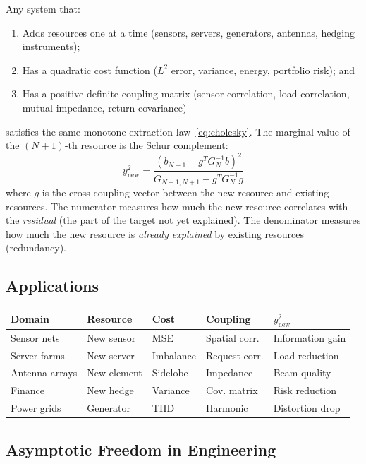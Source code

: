 \documentclass[11pt,a4paper]{article}
\begin{document}
Any system that:
\begin{enumerate}
  \item Adds resources one at a time (sensors, servers, generators,
    antennas, hedging instruments);
  \item Has a quadratic cost function ($L^2$ error, variance, energy,
    portfolio risk); and
  \item Has a positive-definite coupling matrix (sensor correlation,
    load correlation, mutual impedance, return covariance)
\end{enumerate}
satisfies the same monotone extraction law~\eqref{eq:cholesky}.
The marginal value of the $(N+1)$-th resource is the Schur complement:
\begin{equation}\label{eq:schur}
  y_{\text{new}}^2 = \frac{(b_{N+1} - g^T G_N^{-1} b)^2}
    {G_{N+1,N+1} - g^T G_N^{-1} g}
\end{equation}
where $g$ is the cross-coupling vector between the new resource and
existing resources. The numerator measures how much the new resource
correlates with the \emph{residual} (the part of the target not yet
explained). The denominator measures how much the new resource is
\emph{already explained} by existing resources (redundancy).

\subsection{Applications}

\begin{center}
\small
\begin{tabular}{@{}lllll@{}}
\toprule
\textbf{Domain} & \textbf{Resource} & \textbf{Cost} & \textbf{Coupling} & \textbf{$y^2_\text{new}$} \\
\midrule
Sensor nets & New sensor & MSE & Spatial corr. & Information gain \\
Server farms & New server & Imbalance & Request corr. & Load reduction \\
Antenna arrays & New element & Sidelobe & Impedance & Beam quality \\
Finance & New hedge & Variance & Cov. matrix & Risk reduction \\
Power grids & Generator & THD & Harmonic & Distortion drop \\
\bottomrule
\end{tabular}
\end{center}

\subsection{Asymptotic Freedom in Engineering}
\end{document}
